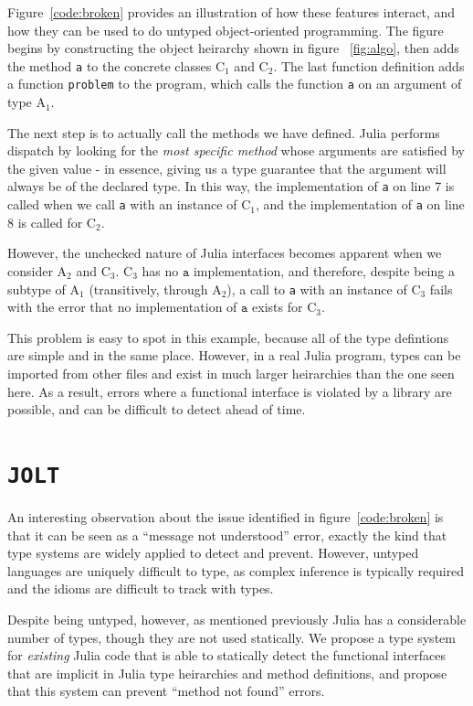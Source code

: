 \documentclass[preprint]{sigplanconf}
\newcommand{\xt}[1]{\texttt{#1}}
\newcommand{\jolt}{\xt{JOLT}}
\newcommand{\cnum}[2]{$\text{#1}_#2$}
\begin{document}
Figure~\ref{code:broken} provides an illustration of how these features 
interact, and how they can be used to do untyped object-oriented programming.
The figure begins by constructing the object heirarchy shown in figure~
\ref{fig:algo}, then adds the method \xt{a} to the concrete classes $\text{C}_1$ and
$\text{C}_2$. The last function definition adds a function \xt{problem} to the
program, which calls the function \xt{a} on an argument of type $\text{A}_1$.

The next step is to actually call the methods we have defined. Julia performs
dispatch by looking for the \emph{most specific method} whose arguments are
satisfied by the given value - in essence, giving us a type guarantee that the
argument will always be of the declared type. In this way, the implementation 
of \xt{a} on line 7 is called when we call \xt{a} with an instance of $\text{C}_1$,
and the implementation of \xt{a} on line 8 is called for $\text{C}_2$.

However, the unchecked nature of Julia interfaces becomes apparent when we consider
$\text{A}_2$ and $\text{C}_3$. \cnum{C}{3} has no $\xt{a}$ implementation, and
therefore, despite being a subtype of \cnum{A}{1} 
(transitively, through \cnum{A}{2}), a call to \xt{a} with an instance of \cnum{C}{3}
fails with the error that no implementation of $\xt{a}$ exists for \cnum{C}{3}.

This problem is easy to spot in this example, because all of the type defintions
are simple and in the same place. However, in a real Julia program, types can be
imported from other files and exist in much larger heirarchies than the one seen
here. As a result, errors where a functional interface is violated by a library
are possible, and can be difficult to detect ahead of time.

\section{\jolt}
An interesting observation about the issue identified in figure~\ref{code:broken}
is that it can be seen as a ``message not understood'' error, exactly the kind
that type systems are widely applied to detect and prevent. However, untyped 
languages are uniquely difficult to type, as complex inference is typically
required and the idioms are difficult to track with types.

Despite being untyped, however, as mentioned previously Julia has a considerable
number of types, though they are not used statically. We propose a type system
for \emph{existing} Julia code that is able to statically detect the functional
interfaces that are implicit in Julia type heirarchies and method definitions,
and propose that this system can prevent ``method not found'' errors.
\end{document}
